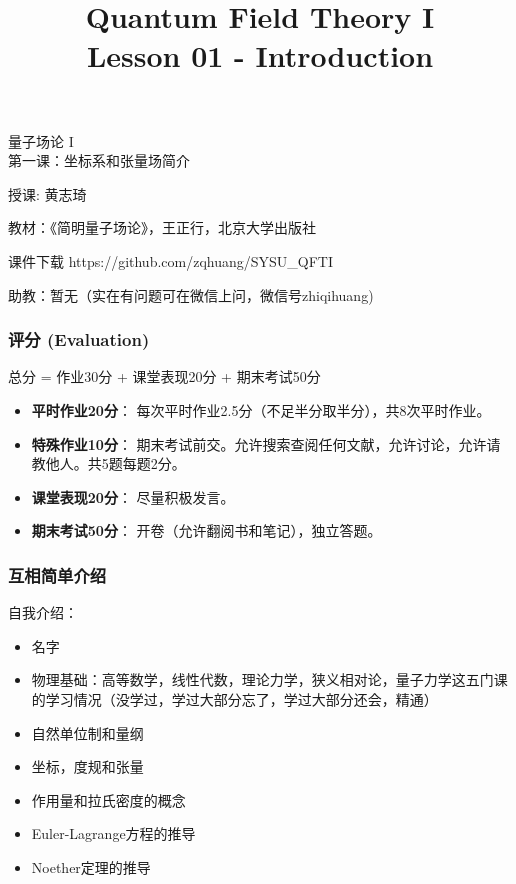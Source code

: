 \documentclass[CJK]{beamer}
\title{Quantum Field Theory I \\ Lesson 01 - Introduction}
\author{}
\date{}
\begin{document}
\begin{frame}
 
\begin{center}
\begin{Large}
\bch
量子场论 I \\
第一课：坐标系和张量场简介

{\vskip 0.3in}

授课: 黄志琦

\ech
\end{Large}
\end{center}

\vskip 0.2in

\bch
教材：《简明量子场论》，王正行，北京大学出版社
\ech

\bch
课件下载
\ech
https://github.com/zqhuang/SYSU\_QFTI

\bch
助教：暂无（实在有问题可在微信上问，微信号zhiqihuang)
\ech
\end{frame}

\begin{frame}
\frametitle{\bch 评分 \ech (Evaluation)}
\bch
总分 = 作业30分 + 课堂表现20分  + 期末考试50分

\begin{itemize}
\item{{\bf 平时作业20分}： 每次平时作业2.5分（不足半分取半分），共8次平时作业。 }
\item{ {\bf 特殊作业10分}： 期末考试前交。允许搜索查阅任何文献，允许讨论，允许请教他人。共5题每题2分。}
\item{{\bf 课堂表现20分}： 尽量积极发言。}
\item{ {\bf 期末考试50分}： 开卷（允许翻阅书和笔记），独立答题。}
\end{itemize}
\ech
\end{frame}

\begin{frame}
\frametitle{\bch 互相简单介绍 \ech}
\bch
自我介绍：
\begin{itemize}
\item{名字}
\item{物理基础：高等数学，线性代数，理论力学，狭义相对论，量子力学这五门课的学习情况（没学过，学过大部分忘了，学过大部分还会，精通）}
\end{itemize}
\ech
\end{frame}

\begin{frame}
\bch   
\begin{itemize}
\item{自然单位制和量纲}
\item{坐标，度规和张量}
\item{作用量和拉氏密度的概念}
\item{Euler-Lagrange方程的推导}
\item{Noether定理的推导}
\end{itemize}

\ech
\end{frame}
\end{document}
